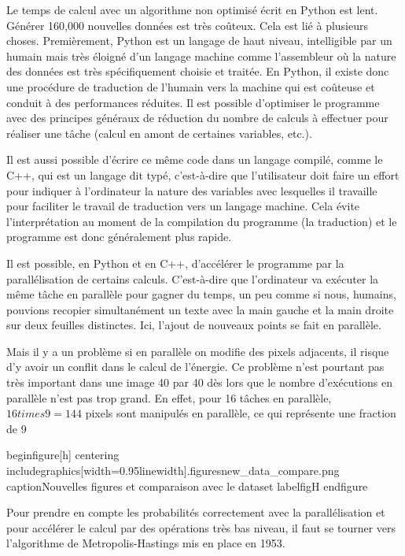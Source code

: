 Le temps de calcul avec un algorithme non optimisé écrit en Python est lent. Générer 160,000 nouvelles données est très coûteux. Cela est lié à plusieurs choses. Premièrement, Python est un langage de haut niveau, intelligible par un humain mais très éloigné d'un langage machine comme l'assembleur où la nature des données est très spécifiquement choisie et traitée. En Python, il existe donc une procédure de traduction de l'humain vers la machine qui est coûteuse et conduit à des performances réduites. Il est possible d'optimiser le programme avec des principes généraux de réduction du nombre de calculs à effectuer pour réaliser une tâche (calcul en amont de certaines variables, etc.). 

Il est aussi possible d'écrire ce même code dans un langage compilé, comme le C++, qui est un langage dit typé, c'est-à-dire que l'utilisateur doit faire un effort pour indiquer à l'ordinateur la nature des variables avec lesquelles il travaille pour faciliter le travail de traduction vers un langage machine. Cela évite l'interprétation au moment de la compilation du programme (la traduction) et le programme est donc généralement plus rapide.

Il est possible, en Python et en C++, d'accélérer le programme par la parallélisation de certains calculs. C'est-à-dire que l'ordinateur va exécuter la même tâche en parallèle pour gagner du temps, un peu comme si nous, humains, pouvions recopier simultanément un texte avec la main gauche et la main droite sur deux feuilles distinctes. Ici, l'ajout de nouveaux points se fait en parallèle. 

Mais il y a un problème  si en parallèle on modifie des pixels adjacents, il risque d'y avoir un conflit dans le calcul de l'énergie. Ce problème n'est pourtant pas très important dans une image 40 par 40 dès lors que le nombre d'exécutions en parallèle n'est pas trop grand. En effet, pour 16 tâches en parallèle, $16 times 9 = 144$ pixels sont manipulés en parallèle, ce qui représente une fraction de 9%

begin{figure}[h]
centering
includegraphics[width=0.95linewidth]{.figuresnew_data_compare.png}
caption{Nouvelles figures et comparaison avec le dataset}
label{figH}
end{figure}

Pour prendre en compte les probabilités correctement avec la parallélisation et pour accélérer le calcul par des opérations très bas niveau, il faut se tourner vers l'algorithme de Metropolis-Hastings mis en place en 1953.


